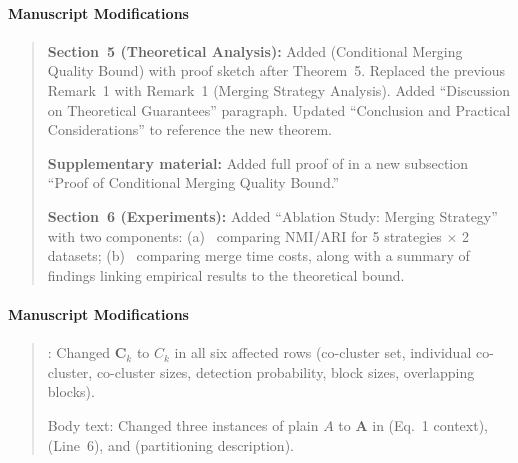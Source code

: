 \documentclass{ar2rc}
\theoremstyle{definition}
\theoremstyle{remark}
\begin{document}
\paragraph{Manuscript Modifications}
\begin{quote}
\textbf{Section~5 (Theoretical Analysis):} Added  (Conditional Merging Quality Bound) with proof sketch after Theorem~5. Replaced the previous Remark~1 with Remark~1 (Merging Strategy Analysis). Added ``Discussion on Theoretical Guarantees'' paragraph. Updated ``Conclusion and Practical Considerations'' to reference the new theorem.

\textbf{Supplementary material:} Added full proof of  in a new subsection ``Proof of Conditional Merging Quality Bound.''

\textbf{Section~6 (Experiments):} Added  ``Ablation Study: Merging Strategy'' with two components: (a)~ comparing NMI/ARI for 5 strategies $\times$ 2 datasets; (b)~ comparing merge time costs, along with a summary of findings linking empirical results to the theoretical bound.
\end{quote}



\paragraph{Manuscript Modifications}
\begin{quote}
: Changed $\mathbf{C}_k$ to $C_k$ in all six affected rows (co-cluster set, individual co-cluster, co-cluster sizes, detection probability, block sizes, overlapping blocks).

Body text: Changed three instances of plain $A$ to $\mathbf{A}$ in  (Eq.~1 context),  (Line~6), and  (partitioning description).
\end{quote}
\end{document}
